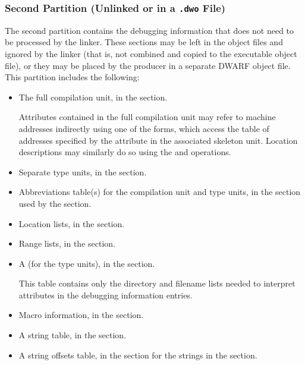 \subsubsection{Second Partition (Unlinked or in a \texttt{.dwo} File)}
The second partition contains the debugging information that
does not need to be processed by the linker. These sections
may be left in the object files and ignored by the linker
(that is, not combined and copied to the executable object file), or
they may be placed by the producer in a separate DWARF object
file. This partition includes the following:
\begin{itemize}
\item
The full compilation unit, in the \dotdebuginfodwo{} section.

Attributes contained in the full compilation unit
may refer to machine addresses indirectly using 
\bb
one of the 
\eb
\DWFORMaddrxXNor{} 
forms, which access the table of addresses specified by the
\DWATaddrbase{} attribute in the associated skeleton unit.
Location descriptions may similarly do so using the \DWOPaddrx{} and
\DWOPconstx{} operations. 

\item Separate type units, in the \dotdebuginfodwo{} section.

\item
Abbreviations table(s) for the compilation unit and type
units, in the \dotdebugabbrevdwo{} section
used by the \dotdebuginfodwo{} section.

\item Location lists, in the 
\dotdebugloclistsdwo{} section.

\item Range lists, in the \dotdebugrnglistsdwo{} section.

\item
A  (for the type units), 
in the \dotdebuglinedwo{} section. 

This table
contains only the directory and filename lists needed to
interpret \DWATdeclfile{} attributes in the debugging
information entries.

\item Macro information, in the \dotdebugmacrodwo{} section.

\item A string table, in the \dotdebugstrdwo{} section.

\item A string offsets table, in the \dotdebugstroffsetsdwo{}
section
for the strings in the \dotdebugstrdwo{} section.
\end{itemize}

